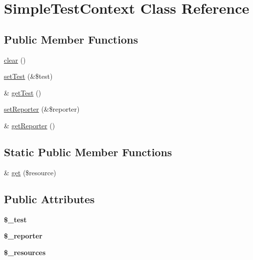 \hypertarget{class_simple_test_context}{
\section{SimpleTestContext Class Reference}
\label{class_simple_test_context}
}
\subsection*{Public Member Functions}
\begin{DoxyCompactItemize}
\item 
\hyperlink{class_simple_test_context_aeb3f91185b0b4e1895d4891d08b5af00}{clear} ()
\item 
\hyperlink{class_simple_test_context_a8ceb3b2b4c27afbeea1957498015f636}{setTest} (\&\$test)
\item 
\& \hyperlink{class_simple_test_context_ae92c4b08904579ecde5d440b8e8023cf}{getTest} ()
\item 
\hyperlink{class_simple_test_context_a9d8f37526e9d18cc89574ac861e66f3d}{setReporter} (\&\$reporter)
\item 
\& \hyperlink{class_simple_test_context_a7d74e323221b6fa095929e46dc2811ac}{getReporter} ()
\end{DoxyCompactItemize}
\subsection*{Static Public Member Functions}
\begin{DoxyCompactItemize}
\item 
\& \hyperlink{class_simple_test_context_a8d245b59718e7818c6850b807643ccbc}{get} (\$resource)
\end{DoxyCompactItemize}
\subsection*{Public Attributes}
\begin{DoxyCompactItemize}
\item 
\hypertarget{class_simple_test_context_a93fb70e507e8dbeb1bf4d19ffbb9b48d}{
{\bfseries \$\_\-test}}
\label{class_simple_test_context_a93fb70e507e8dbeb1bf4d19ffbb9b48d}

\item 
\hypertarget{class_simple_test_context_a5ad6ce921e16991fda5b9bfb54d1b213}{
{\bfseries \$\_\-reporter}}
\label{class_simple_test_context_a5ad6ce921e16991fda5b9bfb54d1b213}

\item 
\hypertarget{class_simple_test_context_aa152b9a020c39bae6d90a4743950f25e}{
{\bfseries \$\_\-resources}}
\label{class_simple_test_context_aa152b9a020c39bae6d90a4743950f25e}

\end{DoxyCompactItemize}


